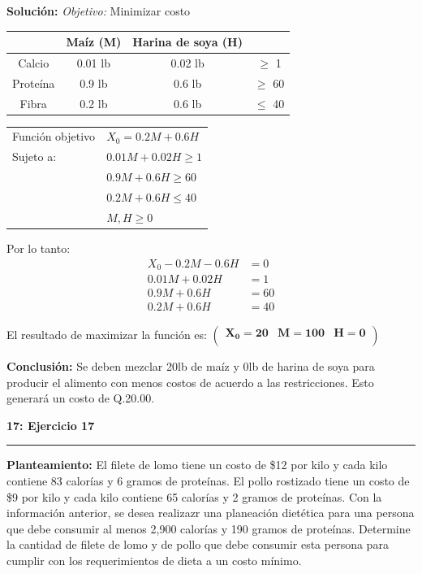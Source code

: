 \documentclass[11pt]{article}
\newcommand\problema[2]{\vspace{.01in}\textbf{#1: #2}\vspace{.5em}\hrule\vspace{.10in}}
\newcommand\planteamiento{\vspace{.10in}\textbf{Planteamiento: }}
\newcommand\solucion{\vspace{.10in}\textbf{Solución: }}
\newcommand\conclusion{\vspace{.10in}\textbf{Conclusión: }}
\newcommand\obj{\vspace{.10in}\textit{Objetivo: }}
\begin{document}
\solucion
\obj Minimizar costo

\begin{tabular}{|c|c|c|c|}
\hline 
 & Maíz (M) & Harina de soya (H) &  \\ 
\hline 
Calcio & 0.01 lb & 0.02 lb & $\geq$ 1 \\ 
\hline 
Proteína & 0.9 lb & 0.6 lb & $\geq$ 60 \\ 
\hline 
Fibra & 0.2 lb & 0.6 lb & $\leq$ 40 \\ 
\hline 
\end{tabular}

\begin{table}[h]
\begin{tabular}{ll}
Función objetivo & $X_0 = 0.2M+0.6H$    \\
Sujeto a:        & $0.01M + 0.02H \geq 1$ \\
                 & $0.9M + 0.6H \geq 60$ \\
                 & $0.2M + 0.6H \leq 40$ \\
                 & $M,H \geq 0$    
\end{tabular}
\end{table}

Por lo tanto:
\begin{align*}
X_0 - 0.2M - 0.6H &= 0\\
0.01M + 0.02H &= 1\\
0.9M + 0.6H &= 60\\
0.2M + 0.6H &= 40
\end{align*}

El resultado de maximizar la función es:
\begin{math}
\mathbf{\left(\begin{array}{rrr}X_0=20&M=100&H=0\\\end{array}\right)}
\end{math}

\conclusion Se deben mezclar 20lb de maíz y 0lb de harina de soya para producir el alimento con menos costos de acuerdo a las restricciones. Esto generará un costo de Q.20.00.


\pagebreak
\problema{17}{Ejercicio 17}
\planteamiento
El filete de lomo tiene un costo de \$12 por kilo y cada kilo contiene 83 calorías y 6 gramos de proteínas. El pollo rostizado tiene un costo de \$9 por kilo y cada kilo contiene 65 calorías y 2 gramos de proteínas. Con la información anterior, se desea realizazr una planeación dietética para una persona que debe consumir al menos 2,900 calorías y 190 gramos de proteínas. Determine la cantidad de filete de lomo y de pollo que debe consumir esta persona para cumplir con los requerimientos de dieta a un costo mínimo.
\end{document}
